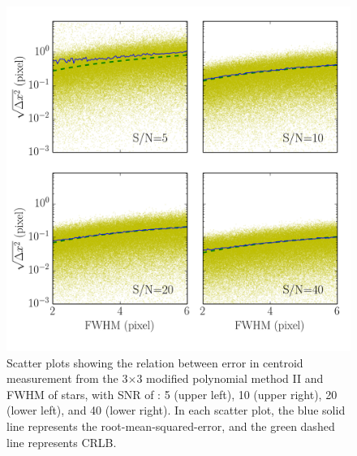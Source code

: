 \documentclass[12pt, preprint]{aastex}
\begin{document}
\begin{figure}[!htb]
  \includegraphics[width=\linewidth]{fwhm_psfpoly.png}
\endminipage
\caption{Scatter plots showing the relation between error in centroid measurement
from the 3$\times$3 modified polynomial method II and FWHM of stars, with SNR  of : 5 (upper left),
10 (upper right), 20 (lower left), and 40 (lower right). In each scatter plot, the blue solid
 line represents the root-mean-squared-error, and the green dashed line represents CRLB.}\label{7}
\end{figure}
\end{document}
